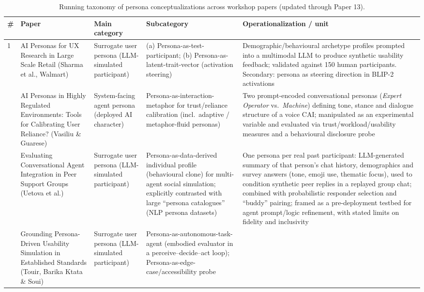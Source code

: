 \begin{table}[t]
\centering
\caption{Running taxonomy of persona conceptualizations across workshop papers (updated through Paper 13).}
\label{tab:persona-taxonomy}
\small
\begin{tabular}{p{0.5cm} p{3.6cm} p{3.4cm} p{3.6cm} p{3.6cm}}
\toprule
\textbf{\#} & \textbf{Paper} & \textbf{Main category} & \textbf{Subcategory} & \textbf{Operationalization / unit} \\
\midrule
1 & AI Personas for UX Research in Large Scale Retail (Sharma et al., Walmart) &
Surrogate user persona (LLM-simulated participant) &
(a) Persona-as-test-participant; (b) Persona-as-latent-trait-vector (activation steering) &
Demographic/behavioural archetype profiles prompted into a multimodal LLM to produce synthetic usability feedback; validated against 150 human participants. Secondary: persona as steering direction in BLIP-2 activations \\
\addlinespace
2 & AI Personas in Highly Regulated Environments: Tools for Calibrating User Reliance? (Vasiliu \& Guarese) &
System-facing agent persona (deployed AI character) &
Persona-as-interaction-metaphor for trust/reliance calibration (incl.\ adaptive / metaphor-fluid personas) &
Two prompt-encoded conversational personas (\textit{Expert Operator} vs.\ \textit{Machine}) defining tone, stance and dialogue structure of a voice CAI; manipulated as an experimental variable and evaluated via trust/workload/usability measures and a behavioural disclosure probe \\
\addlinespace
3 & Evaluating Conversational Agent Integration in Peer Support Groups (Uetova et al.) &
Surrogate user persona (LLM-simulated participant) &
Persona-as-data-derived individual profile (behavioural clone) for multi-agent social simulation; explicitly contrasted with large ``persona catalogues'' (NLP persona datasets) &
One persona per real past participant: LLM-generated summary of that person's chat history, demographics and survey answers (tone, emoji use, thematic focus), used to condition synthetic peer replies in a replayed group chat; combined with probabilistic responder selection and ``buddy'' pairing; framed as a pre-deployment testbed for agent prompt/logic refinement, with stated limits on fidelity and inclusivity \\
\addlinespace
4 & Grounding Persona-Driven Usability Simulation in Established Standards (Touir, Barika Ktata \& Soui) &
Surrogate user persona (LLM-simulated participant) &
Persona-as-autonomous-task-agent (embodied evaluator in a perceive--decide--act loop); Persona-as-edge-case/accessibility probe &

\end{tabular}
\end{table}
